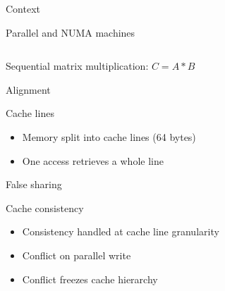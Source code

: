 \documentclass[xcolor={usenames,dvipsnames},hyperref={pdfusetitle}]{beamer}
\begin{document}
\begin{section}{Context}
\begin{frame}{Parallel and NUMA machines}
    \begin{columns}
        \begin{column}{.2\linewidth}
            \begin{block}{}
            \end{block}
        \end{column}
        \begin{column}{.8\linewidth}
            \resizebox{!}{.75\textheight}{
                \centering
                
            }
        \end{column}
    \end{columns}
\end{frame}

\begin{frame}{Sequential matrix multiplication: $C=A*B$}
    \centering
    \scalebox{.6}{
        
    }
\end{frame}

\begin{frame}{Alignment}
    \hspace{-40pt}
    \scalebox{.8}{
        
    }
    \begin{block}{Cache lines}
        \begin{itemize}
            \item Memory split into cache lines (64 bytes)
            \item<alert@1-> One access retrieves a whole line
        \end{itemize}
    \end{block}
\end{frame}

\begin{frame}{False sharing}
    \hspace{-35pt}
    \scalebox{.8}{
        
    }
    \vspace{20pt}
    \begin{block}{Cache consistency}
        \begin{itemize}
            \item Consistency handled at cache line granularity
            \item<alert@1-> Conflict on parallel write
            \item Conflict freezes cache hierarchy
        \end{itemize}
    \end{block}
\end{frame}


\end{section}
\end{document}
